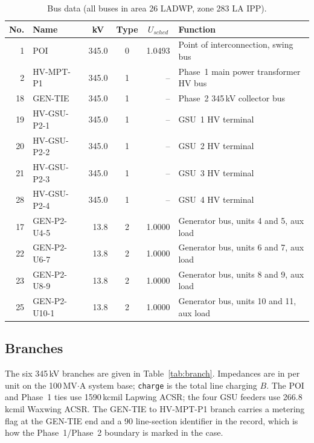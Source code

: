 \begin{table}[!ht]
\centering
\begin{tabularx}{\linewidth}{@{}r l r c r X@{}}
\toprule
\multicolumn{1}{c}{\textbf{No.}} & \textbf{Name} & \multicolumn{1}{c}{\textbf{kV}} & \multicolumn{1}{c}{\textbf{Type}} & \multicolumn{1}{c}{\textbf{$U_{sched}$}} & \textbf{Function} \\
\midrule
 1 & POI         & 345.0 & 0 & 1.0493 & Point of interconnection, swing bus \\
 2 & HV-MPT-P1   & 345.0 & 1 & --     & Phase~1 main power transformer HV bus \\
18 & GEN-TIE     & 345.0 & 1 & --     & Phase~2 345\,kV collector bus \\
19 & HV-GSU-P2-1 & 345.0 & 1 & --     & GSU~1 HV terminal \\
20 & HV-GSU-P2-2 & 345.0 & 1 & --     & GSU~2 HV terminal \\
21 & HV-GSU-P2-3 & 345.0 & 1 & --     & GSU~3 HV terminal \\
28 & HV-GSU-P2-4 & 345.0 & 1 & --     & GSU~4 HV terminal \\
17 & GEN-P2-U4-5 & 13.8  & 2 & 1.0000 & Generator bus, units 4 and 5, aux load \\
22 & GEN-P2-U6-7 & 13.8  & 2 & 1.0000 & Generator bus, units 6 and 7, aux load \\
23 & GEN-P2-U8-9 & 13.8  & 2 & 1.0000 & Generator bus, units 8 and 9, aux load \\
25 & GEN-P2-U10-1 & 13.8 & 2 & 1.0000 & Generator bus, units 10 and 11, aux load \\
\bottomrule
\end{tabularx}
\caption{Bus data (all buses in area 26 LADWP, zone 283 LA IPP).}
\label{tab:bus}
\end{table}

\subsection{Branches}

The six 345\,kV branches are given in Table~\ref{tab:branch}. Impedances are in per
unit on the 100\,MV$\cdot$A system base; \texttt{charge} is the total line charging
$B$. The POI and Phase~1 ties use 1590\,kcmil Lapwing ACSR; the four GSU feeders use
266.8\,kcmil Waxwing ACSR. The GEN-TIE to HV-MPT-P1 branch carries a metering flag
at the GEN-TIE end and a 90 line-section identifier in the record, which is how the
Phase~1/Phase~2 boundary is marked in the case.

